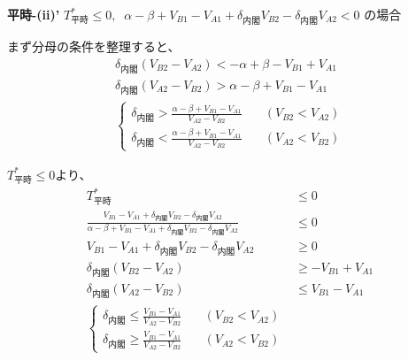 \documentclass[main.tex]{subfiles}
\begin{document}
\newpage
\textbf{平時-(ii)'}\; $T^*_{平時} \le 0,\;\; \alpha-\beta + V_{B1}-V_{A1} + \delta_{内閣}V_{B2} - \delta_{内閣}V_{A2} < 0$ の場合


まず分母の条件を整理すると、
\begin{align*}
    \delta_{内閣}(V_{B2} - V_{A2}) < -\alpha+\beta - V_{B1}+V_{A1} \\
    \delta_{内閣}(V_{A2} - V_{B2}) > \alpha-\beta + V_{B1}-V_{A1}\\
    \begin{cases}
        \delta_{内閣} > \frac{\alpha-\beta + V_{B1}-V_{A1}}{V_{A2} - V_{B2}} \quad &(V_{B2} < V_{A2})\\[1em]
        \delta_{内閣} < \frac{\alpha-\beta + V_{B1}-V_{A1}}{V_{A2} - V_{B2}} \quad &(V_{A2} < V_{B2})
    \end{cases}
\end{align*}

$T^*_{平時} \le 0$より、
\begin{align*}
    T^*_{平時} &\le 0 \\
    \frac{ V_{B1} - V_{A1} +\delta_{内閣}V_{B2} - \delta_{内閣}V_{A2} }{ \alpha-\beta + V_{B1}-V_{A1} + \delta_{内閣}V_{B2} - \delta_{内閣}V_{A2} } &\le 0 \\
    V_{B1} - V_{A1} +\delta_{内閣}V_{B2} - \delta_{内閣}V_{A2} &\ge 0 \\
    \delta_{内閣}(V_{B2} - V_{A2}) &\ge - V_{B1} + V_{A1}\\
    \delta_{内閣}(V_{A2} - V_{B2}) &\le V_{B1} - V_{A1}\\
    \begin{cases}
        \delta_{内閣} \le \frac{V_{B1} - V_{A1}}{V_{A2} - V_{B2}} \quad &(V_{B2} < V_{A2}) \\[1em]
        \delta_{内閣} \ge \frac{V_{B1} - V_{A1}}{V_{A2} - V_{B2}} \quad &(V_{A2} < V_{B2})
    \end{cases}
\end{align*}
\end{document}
